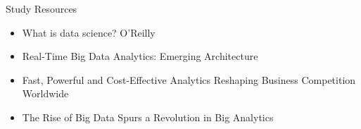\documentclass[RevoRtalk.tex]{subfiles}
\begin{document}
Study Resources

\begin{itemize}
\item What is data science? O’Reilly
\item Real-Time Big Data Analytics: Emerging Architecture
\item Fast, Powerful and Cost-Effective Analytics Reshaping Business Competition Worldwide
\item The Rise of Big Data Spurs a Revolution in Big Analytics
\end{itemize}
\end{document}
